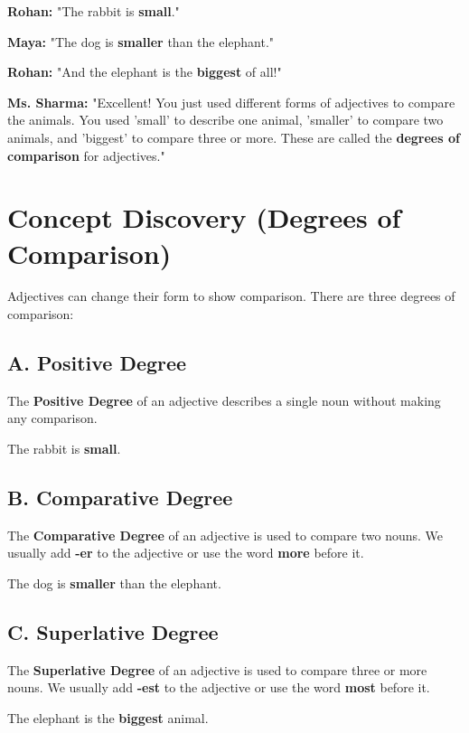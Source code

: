 \textbf{Rohan:} "The rabbit is \textbf{small}."

\textbf{Maya:} "The dog is \textbf{smaller} than the elephant."

\textbf{Rohan:} "And the elephant is the \textbf{biggest} of all!"

\textbf{Ms. Sharma:} "Excellent! You just used different forms of adjectives to compare the animals. You used 'small' to describe one animal, 'smaller' to compare two animals, and 'biggest' to compare three or more. These are called the \textbf{degrees of comparison} for adjectives."

\section{Concept Discovery (Degrees of Comparison)}
Adjectives can change their form to show comparison. There are three degrees of comparison:

\subsection*{A. Positive Degree}
The \textbf{Positive Degree} of an adjective describes a single noun without making any comparison.
\begin{examplebox}
    The rabbit is \textbf{small}.
\end{examplebox}

\subsection*{B. Comparative Degree}
The \textbf{Comparative Degree} of an adjective is used to compare two nouns. We usually add \textbf{-er} to the adjective or use the word \textbf{more} before it.
\begin{examplebox}
    The dog is \textbf{smaller} than the elephant.
\end{examplebox}

\subsection*{C. Superlative Degree}
The \textbf{Superlative Degree} of an adjective is used to compare three or more nouns. We usually add \textbf{-est} to the adjective or use the word \textbf{most} before it.
\begin{examplebox}
    The elephant is the \textbf{biggest} animal.
\end{examplebox}

